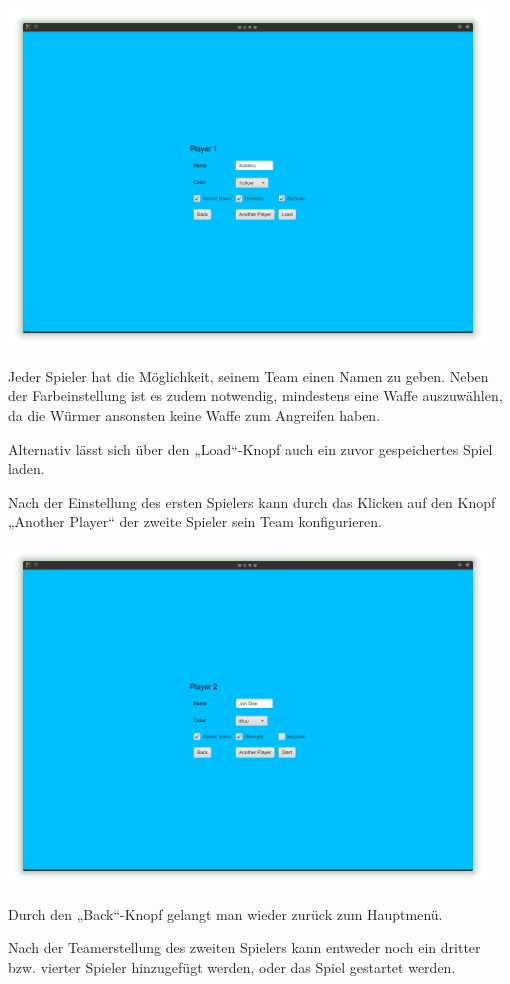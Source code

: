\documentclass{scrreprt}
\begin{document}
\includegraphics[height=9cm]{Screenshot5.png}

Jeder Spieler hat die Möglichkeit, seinem Team einen Namen zu geben.
Neben der Farbeinstellung ist es zudem notwendig, mindestens eine Waffe auszuwählen, da die Würmer ansonsten keine Waffe zum Angreifen haben.

Alternativ lässt sich über den „Load“-Knopf auch ein zuvor gespeichertes Spiel laden.

Nach der Einstellung des ersten Spielers kann durch das Klicken auf den Knopf „Another Player“ der zweite Spieler sein Team konfigurieren.

\includegraphics[height=9cm]{Screenshot6.png}

Durch den „Back“-Knopf gelangt man wieder zurück zum Hauptmenü.

Nach der Teamerstellung des zweiten Spielers kann entweder noch ein dritter bzw. vierter Spieler
hinzugefügt werden, oder das Spiel gestartet werden.
\end{document}
